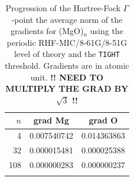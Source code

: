 \documentclass[prl,twocolumn,showpacs,twocolumngrid,superbib]{revtex4}
\begin{document}
\begin{table}[t]
  \centering
  \caption{\protect
    Progression of the Hartree-Fock $\Gamma$-point the average norm of the gradients
    for (MgO)$_n$ using the periodic 
    RHF-MIC/8-61G/8-51G level of theory and the {\tt TIGHT} threshold. 
    Gradients are in atomic unit. {\bf !! NEED TO MULTIPLY THE GRAD BY $\sqrt{3}$ !!}
  }\label{Tab:GradMgO}
  \begin{tabular}{rcc}
  \toprule
   $n$ & grad Mg & grad O \\
  \hline
         4 & 0.007540742 & 0.014363863 \\
        32 & 0.000015481 & 0.000025388 \\
       108 & 0.000000283 & 0.000000237 \\
  \botrule
  \end{tabular}
\end{table}
%
\end{document}
